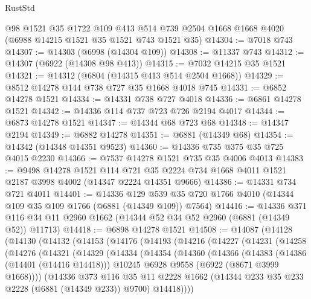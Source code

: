 \begin{lexlean}{RustStd}
\begin{coremodule}
    @98
    @1521
    @35
    @1722
    @109
    @413
    @514
    @739
    @2504
    @1668
    @1668
    @4020
    (@6988 @14215 @1521 @35 @1521 @743 @1521 @35)
@14304 := @7018 @743
@14307 := @14303 (@6998 (@14304 @109))
@14308 := @11337 @743
@14312 := @14307 (@6922 (@14308 @98 @413))
@14315 := @7032 @14215 @35 @1521
@14321 := @14312 (@6804 (@14315 @413 @514 @2504 @1668))
@14329 := @8512 @14278 @144 @738 @727 @35 @1668 @4018 @745
@14331 := @6852 @14278 @1521
@14334 := @14331 @738 @727 @4018
@14336 := @6861 @14278 @1521
@14342 := @14336 @114 @737 @723 @726 @2194 @4017
@14344 := @6873 @14278 @1521
@14347 := @14344 @68 @723 @68
@14348 := @14347 @2194
@14349 := @6882 @14278
@14351 := @6881 (@14349 @68)
@14354 := @14342 (@14348 @14351 @9523)
@14360 := @14336 @735 @375 @35 @725 @4015 @2230
@14366 := @7537 @14278 @1521 @735 @35 @4006 @4013
@14383 := @9498
    @14278
    @1521
    @114
    @721
    @35
    @2224
    @734
    @1668
    @4011
    @1521
    @2187
    @3998
    @4002
    (@14347 @2224 @14351 @9666)
@14386 := @14331 @734 @721 @4011
@14401 := @14336
    @129
    @539
    @35
    @720
    @1766
    @4010
    (@14344 @109 @35 @109 @1766 (@6881 (@14349 @109)) @7564)
@14416 := @14336
    @371
    @116
    @34
    @11
    @2960
    @1662
    (@14344 @52 @34 @52 @2960 (@6881 (@14349 @52)) @11713)
@14418 := @6898 @14278 @1521
@14508 := @14087
    (@14128
      (@14130
        (@14132
          (@14153
            (@14176
              (@14193
                (@14216
                  (@14227
                    (@14231
                      (@14258
                        (@14276
                          (@14321
                            (@14329
                              (@14334
                                (@14354
                                  (@14360
                                    (@14366
                                      (@14383
                                        (@14386 (@14401 (@14416 @14418)))
                                        @10245
                                        @6928
                                        @9558
                                        (@6922 (@8671 @3999 @1668))))
                                    (@14336
                                      @373
                                      @116
                                      @35
                                      @11
                                      @2228
                                      @1662
                                      (@14344 @233 @35 @233 @2228 (@6881 (@14349 @233)) @9700)
                                      @14418))))

\end{coremodule}
\end{lexlean}
